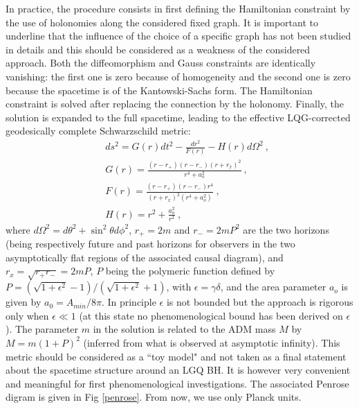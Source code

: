 \documentclass[twocolumn,amsmath,amssymb,prl,10pt,nofootinbib,superscriptaddress]{revtex4}
\begin{document}
In practice, the procedure consists in first defining the Hamiltonian constraint by the use of holonomies along the considered fixed graph. It is important to underline  that the influence of the choice of a specific graph  has not been studied in details and this should be considered as a weakness of the considered approach. Both the diffeomorphism and Gauss constraints are identically vanishing: the first one is zero because of homogeneity and the second one is zero because the spacetime is of the Kantowski-Sachs form. The Hamiltonian constraint is solved after replacing the connection by the holonomy. Finally, the solution is expanded to the full spacetime, leading to the effective LQG-corrected geodesically complete Schwarzschild metric:
\begin{eqnarray}
&& ds^2 =  G(r) dt^2 - \frac{dr^2}{F(r)} - H(r) d\Omega^2~, \nonumber \\
&& G(r) = \frac{(r-r_+)(r-r_-)(r+ r_{x})^2}{r^4 +a_o^2}~ , \nonumber \\
&& F(r) = \frac{(r-r_+)(r-r_-) r^4}{(r+ r_{x})^2 (r^4 +a_o^2)} ~, \nonumber \\
&& H(r) = r^2 + \frac{a_o^2}{r^2}~,
\label{g}
\end{eqnarray}
where $d \Omega^2 = d \theta^2 + \sin^2 \theta d \phi^2$, $r_+ = 2m$ and $r_-= 2 m P^2$ are the two horizons (being respectively future and past horizons for observers in the two asymptotically flat regions of the associated causal diagram), and $r_x = \sqrt{r_+ r_-} = 2mP$, $P$ being the polymeric function defined by $P = (\sqrt{1+\epsilon^2} -1)/(\sqrt{1+\epsilon^2} +1)$, with $\epsilon=\gamma\delta$, and the area parameter $a_o$ is given by $a_0=A_{min}/8 \pi$. In principle $\epsilon$ is not bounded but the approach is rigorous only when $\epsilon\ll 1$ (at this state no phenomenological bound has been derived on $\epsilon$). The parameter $m$ in the solution is related to the ADM mass $M$ by $M = m (1+P)^2$ (inferred from what is observed at asymptotic infinity). This metric should be considered as a ``toy model" and not taken as a final statement about the spacetime structure around an LGQ BH. It is however very convenient and meaningful for first phenomenological investigations. The associated Penrose digram is given in Fig \ref{penrose}. From now, we use only Planck units. \\
\end{document}
